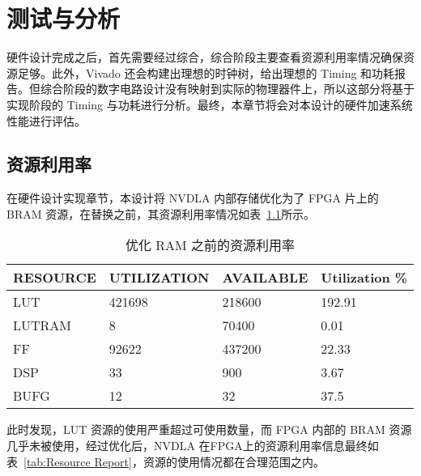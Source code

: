 \chapter{测试与分析}\label{chap:result}

硬件设计完成之后，首先需要经过综合，综合阶段主要查看资源利用率情况确保资源足够。此外，Vivado 还会构建出理想的时钟树，给出理想的 Timing 和功耗报告。但综合阶段的数字电路设计没有映射到实际的物理器件上，所以这部分将基于实现阶段的 Timing 与功耗进行分析。最终，本章节将会对本设计的硬件加速系统性能进行评估。

\section{资源利用率}

在硬件设计实现章节，本设计将 NVDLA 内部存储优化为了 FPGA 片上的 BRAM 资源，在替换之前，其资源利用率情况如表~\ref{tab:Resource Report Before}所示。

\begin{table}[!htbp]
    \caption{优化 RAM 之前的资源利用率}
    \label{tab:Resource Report Before}
    \centering
    \footnotesize%
    \setlength{\tabcolsep}{4pt}%
    \renewcommand{\arraystretch}{1.2}%
    \begin{tabular}{llll}
        \toprule
        \textbf{RESOURCE} & \textbf{UTILIZATION} & \textbf{AVAILABLE} & \textbf{Utilization \%} \\
        \midrule
        LUT               & 421698               & 218600               & 192.91                  \\
        LUTRAM            & 8                    & 70400                & 0.01                    \\
        FF                & 92622                & 437200               & 22.33                   \\
        DSP               & 33                   & 900                  & 3.67                    \\
        BUFG              & 12                   & 32                   & 37.5                    \\
        \bottomrule                   
    \end{tabular}
\end{table}

此时发现，LUT 资源的使用严重超过可使用数量，而 FPGA 内部的 BRAM 资源几乎未被使用，经过优化后，NVDLA 在FPGA上的资源利用率信息最终如表~\ref{tab:Resource Report}，资源的使用情况都在合理范围之内。

